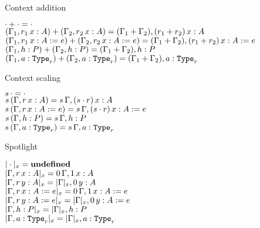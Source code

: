 \begin{frame}{Context addition}

\begin{center}
  $\cdot + \cdot = \cdot$ \\
  $\addctx{(\extend{\Gamma_1}[r_1]{x}{A})}{(\extend{\Gamma_2}[r_2]{x}{A})} = \extend{(\addctx{\Gamma_1}{\Gamma_2})}[(\addqty{r_1}{r_2})]{x}{A}$ \\
  $\addctx{(\extend{\Gamma_1}[r_1]{x}{A}[e])}{(\extend{\Gamma_2}[r_2]{x}{A}[e])} = \extend{(\addctx{\Gamma_1}{\Gamma_2})}[(\addqty{r_1}{r_2})]{x}{A}[e]$ \\
  $(\Gamma_1, h : P) + (\Gamma_2, h : P) = (\Gamma_1 + \Gamma_2), h : P$ \\
  $\addctx{(\extendtype{\Gamma_1}{a}[r])}{(\extendtype{\Gamma_2}{a}[r])} = \extendtype{(\addctx{\Gamma_1}{\Gamma_2})}{a}[r]$
\end{center}

\end{frame}

\begin{frame}{Context scaling}

\begin{center}
  $s\, \cdot = \cdot$ \\
  $\scalectx{s}{(\extend{\Gamma}[r]{x}{A})} = \extend{\scalectx{s}{\Gamma}}[(\mulqty{s}{r})]{x}{A}$ \\
  $\scalectx{s}{(\extend{\Gamma}[r]{x}{A}[e])} = \extend{\scalectx{s}{\Gamma}}[(\mulqty{s}{r})]{x}{A}[e]$ \\
  $s\, (\Gamma, h : P) = s\, \Gamma, h : P$ \\
  $\scalectx{s}{(\extendtype{\Gamma}{a}[r])} = \extendtype{\scalectx{s}{\Gamma}}{a}[r]$ \\
\end{center}

\end{frame}

\begin{frame}{Spotlight}

\begin{center}
  $| \cdot |_{x} = \mathbf{undefined}$ \\
  $\varctx{\extend{\Gamma}[r]{x}{A}}{x} = \extend{\scalectx{\Zero}{\Gamma}}[\One]{x}{A}$ \\
  $\varctx{\extend{\Gamma}[r]{y}{A}}{x} = \extend{\varctx{\Gamma}{x}}[\Zero]{y}{A}$ \\
  $\varctx{\extend{\Gamma}[r]{x}{A}[e]}{x} = \extend{\scalectx{\Zero}{\Gamma}}[\One]{x}{A}[e]$ \\
  $\varctx{\extend{\Gamma}[r]{y}{A}[e]}{x} = \extend{\varctx{\Gamma}{x}}[\Zero]{y}{A}[e]$ \\
  $| \Gamma, h : P |_{x} = | \Gamma |_{x}, h : P$ \\
  $\varctx{\extendtype{\Gamma}{a}[r]}{x} = \extendtype{\varctx{\Gamma}{x}}{a}[r]$
\end{center}

\end{frame}

